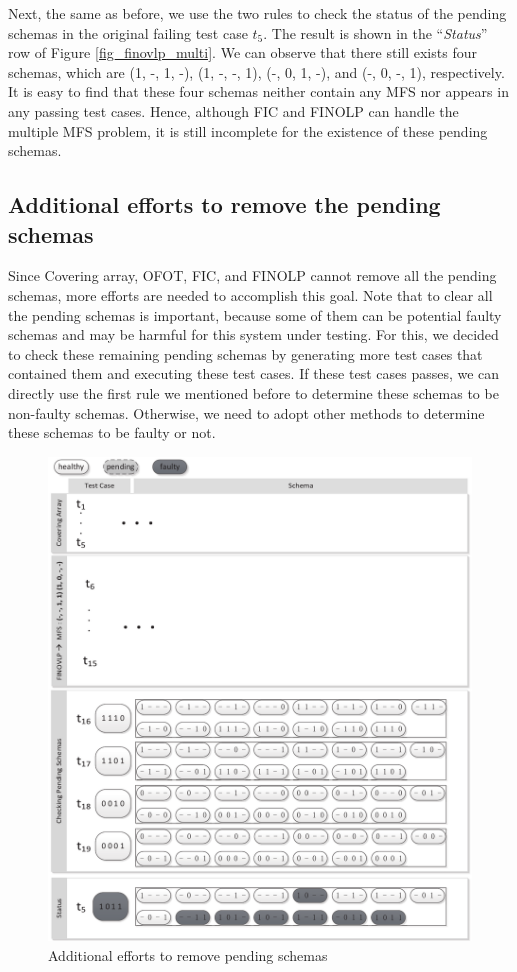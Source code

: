 Next, the same as before, we use the two rules to check the status of the pending schemas in the original failing test case $t_{5}$. The result is shown in the ``\emph{Status}'' row of Figure \ref{fig_finovlp_multi}. We can observe that there still exists four schemas, which are (1, -, 1, -), (1, -, -, 1), (-, 0, 1, -), and (-, 0, -, 1), respectively. It is easy to find that these four schemas neither contain any MFS nor appears in any passing test cases. Hence, although FIC and FINOLP can handle the multiple MFS problem, it is still incomplete for the existence of these pending schemas.

\subsection{Additional efforts to remove the pending schemas}

Since Covering array, OFOT, FIC, and FINOLP cannot remove all the pending schemas, more efforts are needed to accomplish this goal. Note that to clear all the pending schemas is important, because some of them can be potential faulty schemas and may be harmful for this system under testing. For this, we decided to check these remaining pending schemas by generating more test cases that contained them and executing these test cases. If these test cases passes, we can directly use the first rule we mentioned before to determine these schemas to be non-faulty schemas. Otherwise, we need to adopt other methods to determine these schemas to be faulty or not.

\begin{figure}[!htb]
 \centering
 \includegraphics[width=5.3in]{non-pending.pdf}
 \caption{Additional efforts to remove pending schemas}
 \label{fig_no_pending}
\end{figure}

